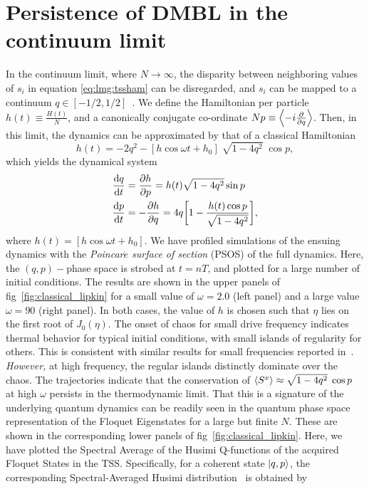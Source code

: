 \documentclass[%
reprint,
superscriptaddress,
amsmath,amssymb,
aps,
prb,
showkeys,
]{revtex4-2}
\begin{document}
	\section{\label{sec:level4}Persistence of DMBL in the continuum limit}
	In the continuum limit, where $N\rightarrow\infty$, the disparity between neighboring values of $s_i$ in equation \ref{eq:lmg:tssham} can be disregarded, and $s_i$ can be mapped to a continuum $q\in \left[-1/2, 1/2\right]$~\cite{mori_prethermalization_2019}. We define	the Hamiltonian per particle $h(t)\equiv \frac{H(t)}{N}$, and a canonically conjugate co-ordinate $Np\equiv \expval{-i\pdv{}{q}}$. Then, in this limit, the dynamics can be approximated by that of a classical Hamiltonian~\cite{sciolla_quantum_2010}
	\begin{equation}
		h(t) = -2 q^2 - \left[h\cos{\omega t} + h_0\right]\;\sqrt{1-4q^2}\;\cos{p},
		\label{eq:class:ham}
	\end{equation}
	which yields the dynamical system 
	\begin{align}
		\dv{q}{t} &= \pdv{h}{p} = h(t)\sqrt{1-4q^2}\sin{p}\nonumber \\
		\dv{p}{t} &= -\pdv{h}{q} = 4q\bigg[1-\frac{h(t)\cos{p}}{\sqrt{1-4q^2}}\bigg],
		\label{eq:class:poinc}
	\end{align}
	where $h(t) = \left[h\cos{\omega t} + h_0\right]$. We have profiled simulations of the ensuing dynamics with the \emph{Poincar$\acute{e}$ surface of section} (PSOS) of the full dynamics. Here, the $\left(q,p\right)-$phase space is strobed at $t=nT$, and plotted for a large number of initial conditions. The results are shown in the upper panels of fig~\ref{fig:classical_lipkin} for a small value of $\omega=2.0$ (left panel) and a large value $\omega=90$ (right panel). In both cases, the value of $h$ is chosen such that $\eta$ lies on the first root of $J_0(\eta)$. The onset of chaos for small drive frequency indicates thermal behavior for typical initial conditions, with small islands of regularity for others. This is consistent with similar results for small frequencies reported in~\cite{russomanno_thermalization_2015, Kidd2019}. \emph{However,} at high frequency, the regular islands distinctly dominate over the chaos. The trajectories indicate that the conservation of $\expval{S^x}\approx \sqrt{1-4q^2}\;\cos{p}$~\cite{mori_prethermalization_2019} at high $\omega$ persists in the thermodynamic limit.
	That this is a signature of the underlying quantum dynamics can be readily seen in the quantum phase space representation of the Floquet Eigenstates for a large but finite $N$. These are shown in the corresponding lower panels of fig~\ref{fig:classical_lipkin}. Here, we have plotted the Spectral Average of the Husimi Q-functions of the acquired Floquet States in the TSS. Specifically, for a coherent state $\ket{q,p}$, the corresponding Spectral-Averaged Husimi distribution~\cite{husimi} is obtained by 
\end{document}
